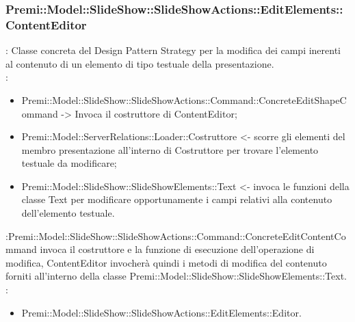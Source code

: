 {       \subsubsection{Premi::Model::SlideShow::SlideShowActions::EditElements::ContentEditor}{
				\textbf{\tipo}: Classe concreta del Design Pattern Strategy per la modifica dei campi inerenti al contenuto di un elemento di tipo testuale della presentazione.\\	
				\textbf{\relaz}: 
				\begin{itemize}
					\item Premi::Model::SlideShow::SlideShowActions::Command::ConcreteEditShapeCommand -> Invoca il costruttore di ContentEditor;
                    \item Premi::Model::ServerRelations::Loader::Costruttore <- scorre gli elementi del membro presentazione all'interno di Costruttore per trovare l'elemento testuale da modificare; 
                    \item Premi::Model::SlideShow::SlideShowElements::Text <- invoca le funzioni della classe Text per modificare opportunamente i campi relativi alla contenuto dell’elemento testuale.
				\end{itemize}	\textbf{\interfacce}:Premi::Model::SlideShow::SlideShowActions::Command::ConcreteEditContentCommand invoca il costruttore e la funzione di esecuzione dell’operazione di modifica, ContentEditor invocherà quindi i metodi di modifica del contenuto forniti all’interno della classe Premi::Model::SlideShow::SlideShowElements::Text.\\
                \textbf{\base}: 
                    \begin{itemize}
                    \item Premi::Model::SlideShow::SlideShowActions::EditElements::Editor.
                    \end{itemize}
                    }
}
